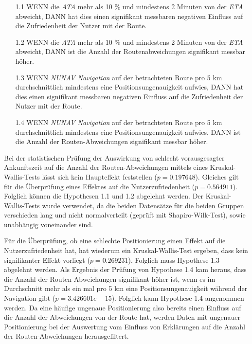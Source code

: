 \begin{enumerate}
    \item[1.1] WENN die \textit{ATA} mehr als 10 \% und mindestens 2 Minuten von der \textit{ETA} abweicht, DANN hat dies einen signifikant messbaren negativen Einfluss auf die Zufriedenheit der Nutzer mit der Route.
    \item[1.2] WENN die \textit{ATA} mehr als 10 \% und mindestens 2 Minuten von der \textit{ETA} abweicht, DANN ist die Anzahl der Routenabweichungen signifikant messbar höher.
    \item[1.3] WENN \textit{NUNAV Navigation} auf der betrachteten Route pro 5 km durchschnittlich mindestens eine Positionsungenauigkeit aufwies, DANN hat dies einen signifikant messbaren negativen Einfluss auf die Zufriedenheit der Nutzer mit der Route.
    \item[1.4] WENN \textit{NUNAV Navigation} auf der betrachteten Route pro 5 km durchschnittlich mindestens eine Positionsungenauigkeit aufwies, DANN ist die Anzahl der Routen-Abweichungen signifikant messbar höher.
\end{enumerate}

Bei der statistischen Prüfung der Auswirkung von schlecht vorausgesagter Ankunftszeit auf die Anzahl der Routen-Abweichungen mittels eines Kruskal-Wallis-Tests lässt sich kein Haupteffekt feststellen ($ p = 0.197648 $). Gleiches gilt für die Überprüfung eines Effektes auf die Nutzerzufriedenheit ($ p = 0.564911 $). Folglich können die Hypothesen 1.1 und 1.2 abgelehnt werden. Der Kruskal-Wallis-Tests wurde verwendet, da die beiden Datensätze für die beiden Gruppen verschieden lang und nicht normalverteilt (geprüft mit Shapiro-Wilk-Test), sowie unabhängig voneinander sind.

Für die Überprüfung, ob eine schlechte Positionierung einen Effekt auf die Nutzerzufriedenheit hat, hat wiederum ein Kruskal-Wallis-Test ergeben, dass kein signifikanter Effekt vorliegt ($ p = 0.269231 $). Folglich muss Hypothese 1.3 abgelehnt werden. Als Ergebnis der Prüfung von Hypothese 1.4 kam heraus, dass die Anzahl der Routen-Abweichungen signifikant höher ist, wenn es im Durchschnitt mehr als ein mal pro 5 km eine Positionsungenauigkeit während der Navigation gibt ($ p = 3.426601e-15 $). Folglich kann Hypothese 1.4 angenommen werden. Da eine häufige ungenaue Positionierung also bereits einen Einfluss auf die Anzahl der Abweichungen von der Route hat, werden Daten mit ungenauer Positionierung bei der Auswertung vom Einfluss von Erklärungen auf die Anzahl der Routen-Abweichungen herausgefiltert.


